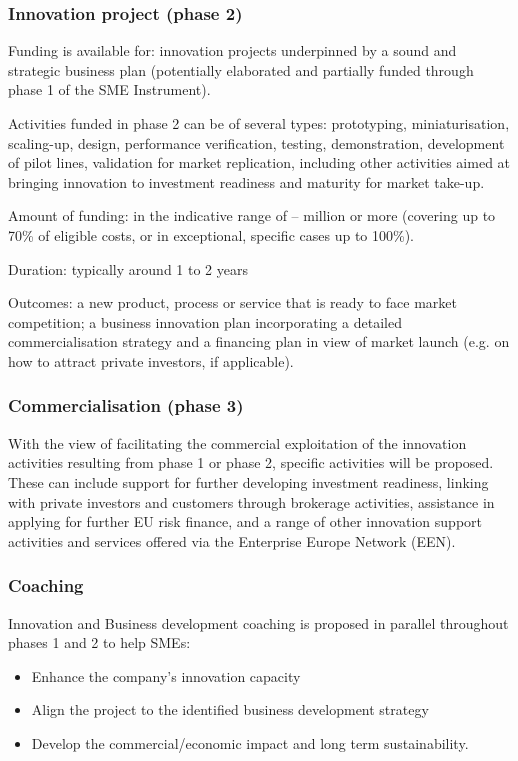 \documentclass{article}
\begin{document}
\subsubsection{Innovation project (phase 2)}

Funding is available for: innovation projects underpinned by a sound and strategic business plan (potentially elaborated and partially funded through phase 1 of the SME Instrument).

Activities funded in phase 2 can be of several types: prototyping, miniaturisation, scaling-up, design, performance verification, testing, demonstration, development of pilot lines, validation for market replication, including other activities aimed at bringing innovation to investment readiness and maturity for market take-up.

Amount of funding: in the indicative range of  –  million or more (covering up to 70\% of eligible costs, or in exceptional, specific cases up to 100\%).

Duration: typically around 1 to 2 years

Outcomes: a new product, process or service that is ready to face market competition; a business innovation plan incorporating a detailed commercialisation strategy and a financing plan in view of market launch (e.g. on how to attract private investors, if applicable).


\subsubsection{Commercialisation (phase 3)}
With the view of facilitating the commercial exploitation of the innovation activities resulting from phase 1 or phase 2, specific activities will be proposed. These can include support for further developing investment readiness, linking with private investors and customers through brokerage activities, assistance in applying for further EU risk finance, and a range of other innovation support activities and services offered via the Enterprise Europe Network (EEN).


\subsubsection{Coaching}
Innovation and Business development coaching is proposed in parallel throughout phases 1 and 2 to help SMEs:
\begin{itemize}
	\item Enhance the company's innovation capacity
    \item Align the project to the identified business development strategy
    \item Develop the commercial/economic impact and long term sustainability.
\end{itemize}
\end{document}

